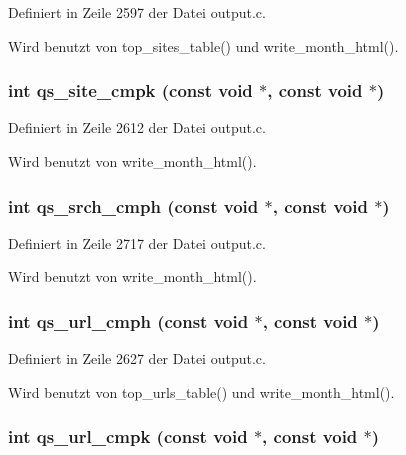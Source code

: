 Definiert in Zeile 2597 der Datei output.c.

Wird benutzt von top\_\-sites\_\-table() und write\_\-month\_\-html().
\subsubsection{\setlength{\rightskip}{0pt plus 5cm}int qs\_\-site\_\-cmpk (const void $\ast$, const void $\ast$)}\label{output_8c_0fe214a5ca06da7ea31019f2491f690f}




Definiert in Zeile 2612 der Datei output.c.

Wird benutzt von write\_\-month\_\-html().
\subsubsection{\setlength{\rightskip}{0pt plus 5cm}int qs\_\-srch\_\-cmph (const void $\ast$, const void $\ast$)}\label{output_8c_c696a3022740c5d7e16758e13cd6240d}




Definiert in Zeile 2717 der Datei output.c.

Wird benutzt von write\_\-month\_\-html().
\subsubsection{\setlength{\rightskip}{0pt plus 5cm}int qs\_\-url\_\-cmph (const void $\ast$, const void $\ast$)}\label{output_8c_aa5ed357df2c1098b3bf0d4fbbf020bb}




Definiert in Zeile 2627 der Datei output.c.

Wird benutzt von top\_\-urls\_\-table() und write\_\-month\_\-html().
\subsubsection{\setlength{\rightskip}{0pt plus 5cm}int qs\_\-url\_\-cmpk (const void $\ast$, const void $\ast$)}\label{output_8c_ba53a184207ad59b18a510a690d29b5d}




